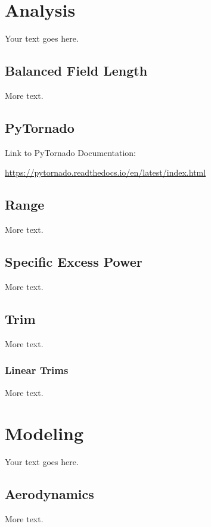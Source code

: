 \documentclass[11pt]{article} %
\begin{document}
\section{Analysis}

Your text goes here.

\subsection{Balanced Field Length}

More text.

\subsection{PyTornado}

Link to PyTornado Documentation: 

\url{https://pytornado.readthedocs.io/en/latest/index.html}

\subsection{Range}

More text.

\subsection{Specific Excess Power}

More text.

\subsection{Trim}

More text.

\subsubsection{Linear Trims}

More text.

\section{Modeling}

Your text goes here.

\subsection{Aerodynamics}

More text.
\end{document}
